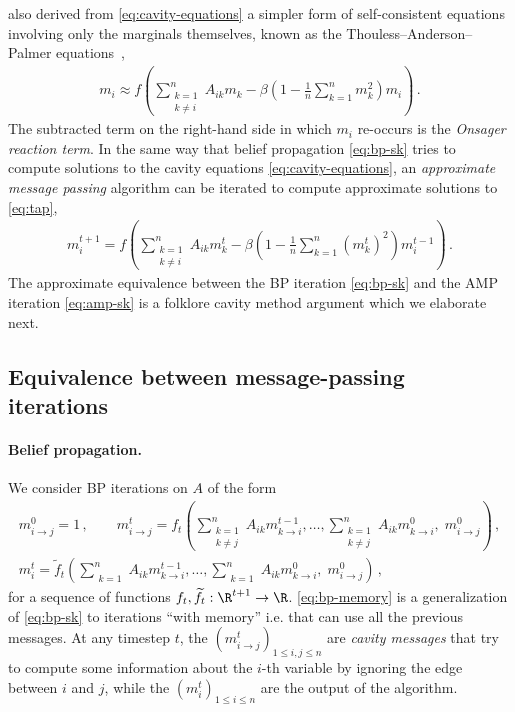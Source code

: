 \documentclass[12pt]{article}
\begin{document}
\cite{mezard1987spinglasstheoryandbeyond} also derived from \cref{eq:cavity-equations} a simpler form of self-consistent equations involving only the marginals themselves, known as the Thouless--Anderson--Palmer equations~\cite{thouless1977solution},
\begin{align}
    m_i \approx f\left(\sum_{\substack{k=1\\k\neq i}}^n A_{ik} m_k - \beta\left(1-\frac 1 n \sum_{k=1}^n m_k^2\right) m_i\right)\,.
    \label{eq:tap}
\end{align}
The subtracted term on the right-hand side in which $m_i$ re-occurs is the \emph{Onsager reaction term}.
In the same way that belief propagation \cref{eq:bp-sk} tries to compute solutions to the cavity equations \cref{eq:cavity-equations}, an \emph{approximate message passing} algorithm can be iterated to compute approximate solutions to \cref{eq:tap},
\begin{align}
    m^{t+1}_i = f\left(\sum_{\substack{k=1\\k \neq i}}^n A_{ik} m^t_k - \beta \left(1-\frac 1 n \sum_{k=1}^n (m_k^t)^2\right) m_i^{t-1}\right)\,.
    \label{eq:amp-sk}
\end{align}
The approximate equivalence between the BP iteration \cref{eq:bp-sk} and the AMP iteration \cref{eq:amp-sk} is a folklore cavity method argument which we elaborate
next.

\subsection{Equivalence between message-passing iterations}
\label{sec:bp-amp}

\paragraph{Belief propagation.} We consider BP iterations
on $A$ of the form
\begin{align}
    \label{eq:bp-memory}
    m^0_{i \to j} = 1\,, \qquad m^{t}_{i \to j} = f_{t}\left(\sum_{\substack{k = 1\\k \neq j}}^n A_{ik}m_{k \to i}^{t-1}, \dots, \sum_{\substack{k = 1\\k \neq j}}^nA_{ik}m_{k \to i}^0,\; m^0_{i \to j}\right)\,,\\
    \nonumber
    m^{t}_i = \widetilde{f}_{t}\left(\sum_{\substack{k = 1}}^nA_{ik}m_{k \to i}^{t-1}, \dots, \sum_{\substack{k = 1}}^nA_{ik}m_{k \to i}^0, \;m^0_{i \to j}\right)\,,
\end{align}
for a sequence of functions $f_t, \widetilde{f}_t: \R^{t+1} \to \R$. \cref{eq:bp-memory} is a generalization of \cref{eq:bp-sk} to iterations ``with memory'' i.e. that can use all the previous messages. At any timestep $t$, the $(m_{i\to j}^t)_{1\le i,j\le n}$ are \textit{cavity messages} that try to compute some information about the $i$-th variable by ignoring the edge between $i$ and $j$, while the $(m_i^t)_{1\le i\le n}$ are the output of the algorithm.
\end{document}
